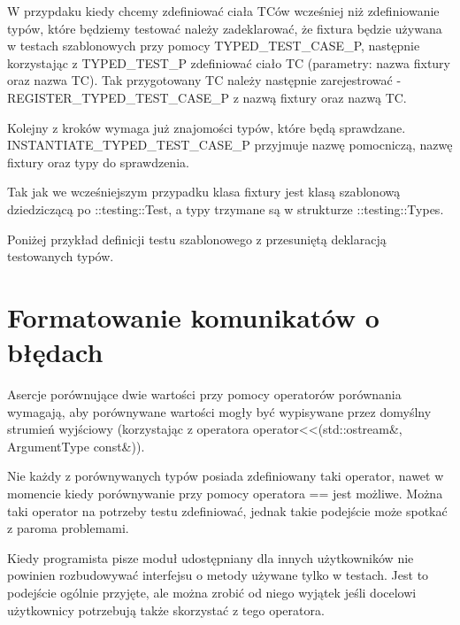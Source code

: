 \documentclass[12pt,a4paper,notitlepage]{report}
\begin{document}
W przypdaku kiedy chcemy zdefiniować ciała TCów wcześniej niż zdefiniowanie typów, które będziemy testować należy zadeklarować, że fixtura będzie używana w testach szablonowych przy pomocy TYPED{\_}TEST{\_}CASE{\_}P, następnie korzystając z TYPED{\_}TEST{\_}P zdefiniować ciało TC (parametry: nazwa fixtury oraz nazwa TC). Tak przygotowany TC należy następnie zarejestrować - REGISTER{\_}TYPED{\_}TEST{\_}CASE{\_}P z nazwą fixtury oraz nazwą TC.

Kolejny z kroków wymaga już znajomości typów, które będą sprawdzane. INSTANTIATE{\_}TYPED{\_}TEST{\_}CASE{\_}P przyjmuje nazwę pomocniczą, nazwę fixtury oraz typy do sprawdzenia.

Tak jak we wcześniejszym przypadku klasa fixtury jest klasą szablonową dziedziczącą po ::testing::Test, a typy trzymane są w strukturze ::testing::Types.

Poniżej przykład definicji testu szablonowego z przesuniętą deklaracją testowanych typów.

			

\chapter{Formatowanie komunikatów o błędach}

Asercje porównujące dwie wartości przy pomocy operatorów porównania wymagają, aby porównywane wartości mogły być wypisywane przez domyślny strumień wyjściowy (korzystając z operatora operator<<(std::ostream\&, ArgumentType const\&)). 

Nie każdy z porównywanych typów posiada zdefiniowany taki operator, nawet w momencie kiedy porównywanie przy pomocy operatora == jest możliwe. Można taki operator na potrzeby testu zdefiniować, jednak takie podejście może spotkać z paroma problemami.

Kiedy programista pisze moduł udostępniany dla innych użytkowników nie powinien rozbudowywać interfejsu o metody używane tylko w testach. Jest to podejście ogólnie przyjęte, ale można zrobić od niego wyjątek jeśli docelowi użytkownicy potrzebują także skorzystać z tego operatora.
\end{document}
